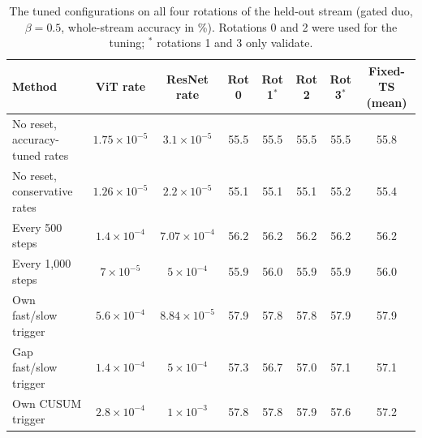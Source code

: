 \begin{table}[t]
  \centering\small
  \begin{tabular}{@{}lccccccc@{}}
    \toprule
    Method & ViT rate & ResNet rate & Rot 0 & Rot 1$^\ast$ & Rot 2 & Rot 3$^\ast$ & Fixed-TS (mean) \\
    \midrule
    No reset, accuracy-tuned rates & $1.75\!\times\!10^{-5}$ & $3.1\!\times\!10^{-5}$ & 55.5 & 55.5 & 55.5 & 55.5 & 55.8 \\
    No reset, conservative rates & $1.26\!\times\!10^{-5}$ & $2.2\!\times\!10^{-5}$ & 55.1 & 55.1 & 55.1 & 55.2 & 55.4 \\
    Every 500 steps & $1.4\!\times\!10^{-4}$ & $7.07\!\times\!10^{-4}$ & 56.2 & 56.2 & 56.2 & 56.2 & 56.2 \\
    Every 1,000 steps & $7\!\times\!10^{-5}$ & $5\!\times\!10^{-4}$ & 55.9 & 56.0 & 55.9 & 55.9 & 56.0 \\
    Own fast/slow trigger & $5.6\!\times\!10^{-4}$ & $8.84\!\times\!10^{-5}$ & 57.9 & 57.8 & 57.8 & 57.9 & 57.9 \\
    Gap fast/slow trigger & $1.4\!\times\!10^{-4}$ & $5\!\times\!10^{-4}$ & 57.3 & 56.7 & 57.0 & 57.1 & 57.1 \\
    Own CUSUM trigger & $2.8\!\times\!10^{-4}$ & $1\!\times\!10^{-3}$ & 57.8 & 57.8 & 57.9 & 57.6 & 57.2 \\
    \bottomrule
  \end{tabular}
  \caption{The tuned configurations on all four rotations of the held-out stream (gated duo, $\beta=0.5$, whole-stream accuracy in \%). Rotations 0 and 2 were used for the tuning; $^\ast$ rotations 1 and 3 only validate.}
  \label{tab:tune_confirm}
\end{table}
